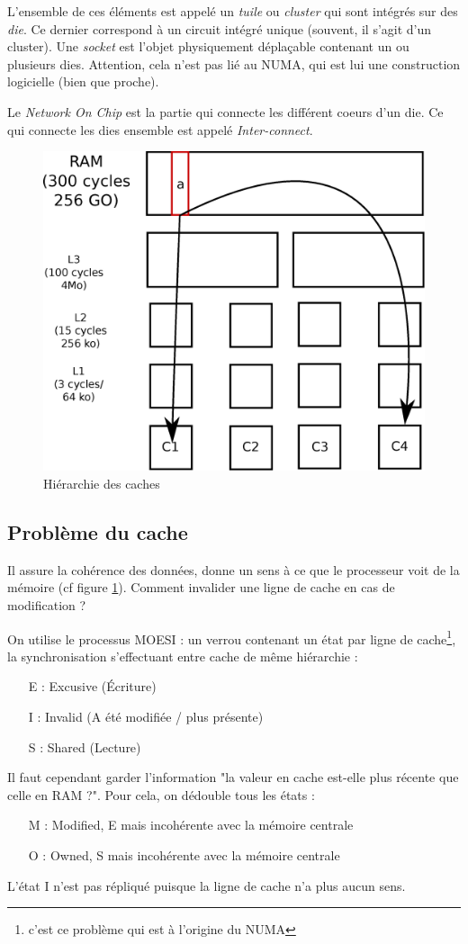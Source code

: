 \documentclass{article}
\begin{document}
L'ensemble de ces éléments est appelé un \emph{tuile} ou \emph{cluster} qui sont intégrés sur des \emph{die}. Ce dernier correspond à un circuit intégré unique (souvent, il s'agit d'un cluster). Une \emph{socket} est l'objet physiquement déplaçable contenant un ou plusieurs dies. Attention, cela n'est pas lié au NUMA, qui est lui une construction logicielle (bien que proche).

Le \emph{Network On Chip} est la partie qui connecte les différent coeurs d'un die. Ce qui connecte les dies ensemble est appelé \emph{Inter-connect}.

\begin{figure}[h]
\centering
\includegraphics[width=0.5\linewidth]{cache.eps}
\caption{\label{fig:cache}Hiérarchie des caches}
\end{figure}

\subsection{Problème du cache}
Il assure la cohérence des données, donne un sens à ce que le processeur voit de la mémoire (cf figure \ref{fig:cache}). Comment invalider une ligne de cache en cas de modification ?

On utilise le processus MOESI : un verrou contenant un état par ligne de cache\footnote{c'est ce problème qui est à l'origine du NUMA}, la synchronisation s'effectuant entre cache de même hiérarchie :
\begin{itemize}
\item[E :] Excusive (Écriture)
\item[I :] Invalid (A été modifiée / plus présente)
\item[S :] Shared (Lecture)
\end{itemize}
Il faut cependant garder l'information "la valeur en cache est-elle plus récente que celle en RAM ?". Pour cela, on dédouble tous les états :
\begin{itemize}
\item[M :] Modified, E mais incohérente avec la mémoire centrale
\item[O :] Owned, S mais incohérente avec la mémoire centrale
\end{itemize}
L'état I n'est pas répliqué puisque la ligne de cache n'a plus aucun sens.
\bigskip
\end{document}
